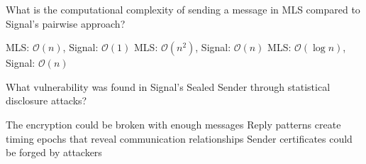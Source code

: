 \documentclass[10pt,a4paper,american]{exam}
\begin{document}
\begin{questions}
	\question What is the computational complexity of sending a message in MLS compared to Signal's pairwise approach?
	\begin{randomizechoices}
		\choice MLS: $\mathcal{O}(n)$, Signal: $\mathcal{O}(1)$
		\choice MLS: $\mathcal{O}(n^2)$, Signal: $\mathcal{O}(n)$
		\CorrectChoice MLS: $\mathcal{O}(\log{}n)$, Signal: $\mathcal{O}(n)$
	\end{randomizechoices}

	\question What vulnerability was found in Signal's Sealed Sender through statistical disclosure attacks?
	\begin{randomizechoices}
		\choice The encryption could be broken with enough messages
		\CorrectChoice Reply patterns create timing epochs that reveal communication relationships
		\choice Sender certificates could be forged by attackers
	\end{randomizechoices}

\end{questions}

\clearpage

\end{document}
